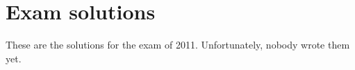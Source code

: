 \documentclass[main]{subfiles}
\begin{document}

\section{Exam solutions}
These are the solutions for the exam of 2011. Unfortunately, nobody wrote them yet.
\end{document}
